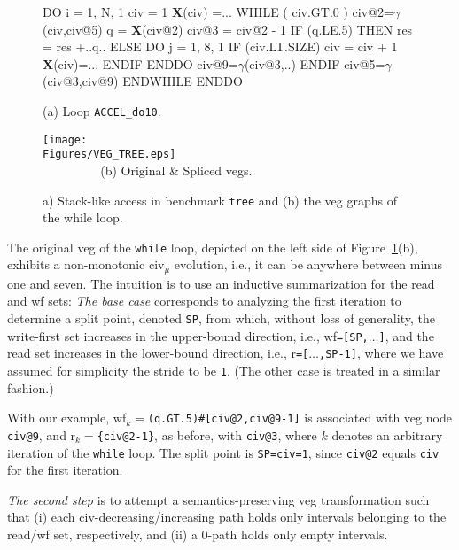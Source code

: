 \documentclass[10pt,nocopyrightspace]{sigplanconf}
\newcommand{\mymath}[1]{$ #1 $}
\newcommand{\Figures}[1]{../Figures/}
\begin{document}
\begin{figure}
\begin{minipage}{0.4\columnwidth}
\begin{colorcode}
DO i = 1, N, 1
 civ = 1
 {\bf{}X}(civ) =...
 WHILE ( civ.GT.0 )
  civ@2=\mymath{\gamma}(civ,civ@5)
  q = {\bf X}(civ@2)
  civ@3 = civ@2 - 1
  IF (q.LE.5) THEN
   res = res +..q..
  ELSE
   DO j = 1, 8, 1
    IF (civ.LT.SIZE) 
      civ = civ + 1
      {\bf{}X}(civ)=...
   ENDIF ENDDO
   civ@9=\mymath{\gamma}(civ@3,..)
  ENDIF
  civ@5=\mymath{\gamma}(civ@3,civ@9)
ENDWHILE ENDDO   
\end{colorcode}
\vspace{-1ex}
(a) Loop {\tt ACCEL\_do10}.
\end{minipage}
\begin{minipage}{0.56\columnwidth}
\texttt{[image: \\Figures/VEG\_TREE.eps]}\\
$\mbox{ }\mbox{ }\mbox{ }\mbox{ }\mbox{ }\mbox{ }\mbox{ }$(b) Original \& Spliced {\sc veg}s.
\end{minipage}
\caption{a) Stack-like access in benchmark {\tt tree} and (b) the {\sc veg} graphs of the while loop.}
\vspace{-1ex}
\label{fig:Tree} %
\end{figure}


The original {\sc veg} of the {\tt while} loop, depicted on the left 
side of Figure~\ref{fig:Tree}(b), exhibits a non-monotonic {\sc civ}$_\mu$
evolution, i.e., it can be anywhere between minus one and seven.
%
The intuition is to use an inductive summarization for the read and {\sc wf} sets:
{\em The base case} corresponds to analyzing the first iteration to determine a split point, 
denoted {\tt SP}, from which, without loss of generality, the write-first set increases in the 
upper-bound direction, i.e., {\sc wf}{\tt=[SP,$\ldots$]}, and the read set increases 
in the lower-bound direction, i.e., {\sc r}{\tt=[$\ldots$,SP-1]}, where we 
have assumed for simplicity the stride to be {\tt 1}.
(The other case is treated in a similar fashion.)

With our example, {\sc wf}$_k=${\tt (q.GT.5)\#[civ@2,civ@9-1]}
is associated with {\sc veg} node {\tt civ@9}, and 
{\sc r}$_k=${\tt \{civ@2-1\}}, as before, with {\tt civ@3}, 
where $k$ denotes an arbitrary iteration of the {\tt while} loop.
The split point is {\tt SP=civ=1}, since {\tt civ@2} equals {\tt civ} 
for the first iteration.

{\em The second step} is to attempt a semantics-preserving {\sc veg} transformation
such that (i) each {\sc civ}-decreasing/increasing path holds only intervals 
belonging to the read/{\sc wf} set, respectively, and (ii) a $0$-path holds
only empty intervals.
\end{document}
